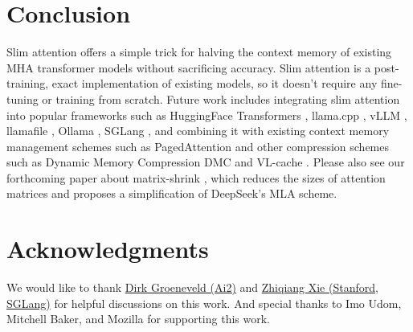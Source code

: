 \documentclass{article}
\begin{document}



\section{Conclusion}
Slim attention offers a simple trick for halving the context memory of existing MHA transformer models without sacrificing accuracy. Slim attention is a post-training, exact implementation of existing models, so it doesn't require any fine-tuning or training from scratch. Future work includes integrating slim attention into popular frameworks such as HuggingFace Transformers \citep{HFtransformers}, llama.cpp \citep{llama-cpp},  vLLM \citep{vLLM}, llamafile \citep{llamafile}, Ollama \citep{ollama}, SGLang \citep{sglang}, and combining it with existing context memory management schemes such as PagedAttention \citep{pagedAttn} and other compression schemes such as Dynamic Memory Compression DMC \citep{DMC} and VL-cache \citep{VL-cache}.
Please also see our forthcoming paper about matrix-shrink \citep{matShrink}, which reduces the sizes of attention matrices and proposes a simplification of DeepSeek's MLA scheme.

\section*{Acknowledgments}
We would like to thank \href{https://scholar.google.com/citations?user=KEhvGNMAAAAJ&hl=en}{Dirk Groeneveld (Ai2)} and \href{https://scholar.google.com/citations?user=Be2fl8sAAAAJ&hl=en}{Zhiqiang Xie (Stanford, SGLang)} for helpful discussions on this work. And special thanks to Imo Udom, Mitchell Baker, and Mozilla for supporting this work.
\end{document}
